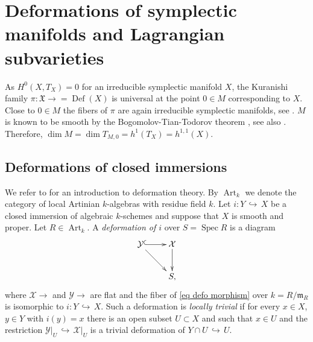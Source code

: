 \documentclass[a4paper,11pt,final]{amsart}
\theoremstyle{plain}
\theoremstyle{definition}
\numberwithin{equation}{section}
\theoremstyle{remark}
\begin{document}
\section[Deformations]{Deformations of symplectic manifolds and Lagrangian subvarieties}\label{sec m}

As $H^0(X, T_{X}) = 0$ for an irreducible symplectic manifold $X$, the Kuranishi family $\pi:{{\mathfrak X}} {\xrightarrow{\ \ }}={{\operatorname{Def}}}(X)$ is universal at the point $0\in M$ corresponding to $X$. 
Close to $0\in M$ the fibers of $\pi$ are again irreducible symplectic manifolds, see \cite[{{$\mathsection\,$}} 8]{Be83}. 
$M$ is known to be smooth by the Bogomolov-Tian-Todorov theorem \cite{Bo78,Ti,To89}, see also \cite[Thm 14.10]{GHJ}. Therefore, $\dim M = \dim T_{M,0}=h^1(T_X)=h^{1,1}(X)$.

\subsection{Deformations of closed immersions}\label{subsection defi}
We refer to \cite{Se} for an introduction to deformation theory. By ${\operatorname{Art}}_k$ we denote the category of local Artinian $k$-algebras with residue field $k$. 
Let $i:Y{{\, \hookrightarrow\,}} X$ be a closed immersion of algebraic $k$-schemes and suppose that $X$ is smooth and proper.
Let $R\in {\operatorname{Art}}_k$. A \emph{deformation of $i$} over $S={\operatorname{Spec}} R$ is a diagram
\begin{equation}\label{eq defo morphism}
\xymatrix{
{{\mathcal Y}} \ar[rd] \ar@{^(->}[r] & {{\mathcal X}} \ar[d]\\
& S, \\
}
\end{equation}
where ${{\mathcal X}}{\xrightarrow{\ \ }}$ and ${{\mathcal Y}}{\xrightarrow{\ \ }}$ are flat and the fiber of \eqref{eq defo morphism} over $k=R/{{\mathfrak m}}_R$ is isomorphic to $i:Y{{\, \hookrightarrow\,}} X$. 
Such a deformation is \emph{locally trivial} if for every $x\in X$, $y\in Y$ with $i(y)=x$ there is an open subset $U\subset X$  and such that $x \in U$ and the restriction ${{\mathcal Y}}\vert_U {{\, \hookrightarrow\,}} {{\mathcal X}}\vert_U$ is a trivial deformation of $Y\cap U {{\, \hookrightarrow\,}} U$.
\end{document}
